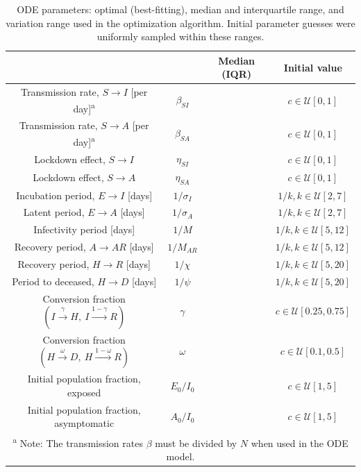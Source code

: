 \documentclass[11pt]{article}
\newcommand{\U}{\mathcal{U}}
\begin{document}
	\begin{table}[h]
		\centering
		\caption{ODE parameters: optimal (best-fitting), median and interquartile range, and variation range used in the optimization algorithm.
			Initial parameter guesses were uniformly sampled within these ranges.}
		\label{tab:parameters}
		\begin{tabular}{ c c c c }
			\hline
			\hline
																								&					&	Median (IQR)	&	Initial value \\
			\hline
			Transmission rate, $S \to I$ [per day]\textsuperscript{a}							&	$\beta_{SI}$	&									&	$c \in \U [0,1]$ \\
			Transmission rate, $S \to A$ [per day]\textsuperscript{a}							&	$\beta_{SA}$	&									& 	$c \in \U [0,1]$ \\
			Lockdown effect, $S \to I$															&	$\eta_{SI}$ 	&									& 	$c \in \U [0,1]$ \\
			Lockdown effect, $S \to A$															&	$\eta_{SA}$		&									& 	$c \in \U [0,1]$ \\
			Incubation period, $E \to I$ [days]													&	$1 / \sigma_I$	&									& 	$1 / k, k \in \U [2,7]$ \\
			Latent period, $E \to A$ [days]														&	$1 / \sigma_A$	&									& 	$1 / k, k \in \U [2,7]$ \\
			Infectivity period [days]															&	$1 / M$			&									& 	$1 / k, k \in \U [5,12]$ \\
			Recovery period, $A \to AR$ [days]													&	$1 / M_{AR}$	&									& 	$1 / k, k \in \U [5,12]$ \\
			Recovery period, $H \to R$ [days]													&	$1 / \chi$		&									& 	$1 / k, k \in \U [5,20]$ \\
			Period to deceased, $H \to D$ [days]												&	$1 / \psi$		&									& 	$1 / k, k \in \U [5,20]$ \\
			Conversion fraction $(I \xrightarrow{\gamma} H, \ I \xrightarrow{1 - \gamma} R)$	&	$\gamma$		&									& 	$c \in \U [0.25,0.75]$ \\
			Conversion fraction $(H \xrightarrow{\omega} D, \ H \xrightarrow{1 - \omega} R)$	&	$\omega$		&									& 	$c \in \U [0.1,0.5]$ \\
			Initial population fraction, exposed												&	$E_0 / I_0$		&									& 	$c \in \U [1,5]$ \\
			Initial population fraction, asymptomatic											&	$A_0 / I_0$		&									& 	$c \in \U [1,5]$ \\
			\hline
			\hline
			\multicolumn{4}{c}{\small \textsuperscript{a} Note: The transmission rates $\beta$ must be divided by $N$ when used in the ODE model.}
		\end{tabular}
	\end{table}
\end{document}
